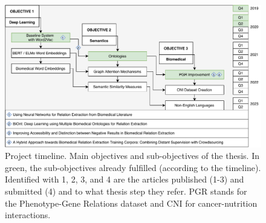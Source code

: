 \begin{landscape}

\begin{figure}
\captionsetup{font=small}
\centering
\includegraphics[width=20cm]{images/timeline.pdf}
\fontsize{9}{10.8}\caption[Thesis Project Timeline]{Project timeline. Main objectives and sub-objectives of the thesis. In green, the sub-objectives already fulfilled (according to the timeline). Identified with 1, 2, 3, and 4 are the articles published (1-3) and submitted (4) and to what thesis step they refer. PGR stands for the Phenotype-Gene Relations dataset and CNI for cancer-nutrition interactions.}
\label{figure:timeline}
\end{figure}

\end{landscape}